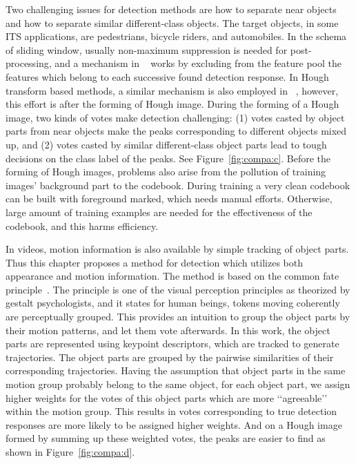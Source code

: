 Two challenging issues for detection methods are how to separate near objects and how to separate similar different-class objects. The target objects, in some ITS applications, are pedestrians, bicycle riders, and automobiles. In the schema of sliding window, usually non-maximum suppression is needed for post-processing, and a mechanism in ~\cite{ac4} works by excluding from the feature pool the features which belong to each successive found detection response. In Hough transform based methods, a similar mechanism is also employed in ~\cite{ac9}, however, this effort is after the forming of Hough image. During the forming of a Hough image, two kinds of votes make detection challenging: (1) votes casted by object parts from near objects make the peaks corresponding to different objects mixed up, and (2) votes casted by similar different-class object parts lead to tough decisions on the class label of the peaks. See Figure~\ref{fig:compa:c}. Before the forming of Hough images, problems also arise from the pollution of training images' background part to the codebook. During training a very clean codebook can be built with foreground marked, which needs manual efforts. Otherwise, large amount of training examples are needed for the effectiveness of the codebook, and this harms efficiency.


In videos, motion information is also available by simple tracking of object parts. Thus this chapter proposes a method for detection which utilizes both appearance and motion information. The method is based on the common fate principle~\cite{ac13}. The principle is one of the visual perception principles as theorized by gestalt psychologists, and it states for human beings, tokens moving coherently are perceptually grouped. This provides an intuition to group the object parts by their motion patterns, and let them vote afterwards. In this work, the object parts are represented using keypoint descriptors, which are tracked to generate trajectories. The object parts are grouped by the pairwise similarities of their corresponding trajectories. Having the assumption that object parts in the same motion group  probably belong to the same object, for each object part, we assign higher weights for the votes of this object parts which are more {\lq\lq}agreeable{\rq\rq} within the motion group. This results in votes corresponding to true detection responses are more likely to be assigned higher weights. And on a Hough image formed by summing up these weighted votes, the peaks are easier to find as shown in Figure~\ref{fig:compa:d}.




